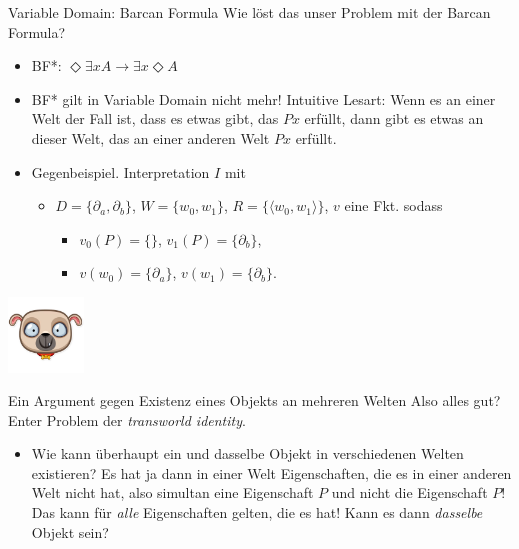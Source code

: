 \documentclass[12pt]{beamer}
\begin{document}
\begin{frame}{Variable Domain: Barcan Formula}
  Wie löst das unser Problem mit der Barcan Formula?
  \begin{itemize}[<+->]
  \item \begin{center} BF*:
      $\Diamond \exists x A \to \exists x \Diamond A$
    \end{center}
  \item BF* gilt in Variable Domain nicht mehr! Intuitive Lesart: Wenn
    es an einer Welt der Fall ist, dass es etwas gibt, das $Px$
    erfüllt, dann gibt es etwas an dieser Welt, das an einer anderen
    Welt $Px$ erfüllt.
  \item Gegenbeispiel. Interpretation $I$ mit
    \begin{itemize}[<+->]
    \item $D = \{\partial_a, \partial_b\}$, $W = \{w_0, w_1\}$,
      $R = \{\langle w_0, w_1 \rangle\}$, $v$ eine Fkt. sodass
      \begin{itemize}[<+->]
      \item $v_0(P) = \{\}$, $v_1(P) = \{\partial_b\}$,
      \item $v(w_0) = \{\partial_a\}$, $v(w_1) = \{\partial_b\}$.
      \end{itemize}
    \end{itemize}
  \end{itemize}

\pause
\begin{center}
      \includegraphics[height=2cm]{happydog.png}
\end{center}
\end{frame}

\begin{frame}{Ein Argument gegen Existenz eines Objekts an mehreren Welten}
Also alles gut? Enter Problem der \emph{transworld identity}.
\pause
\begin{itemize}[<+->]
\item Wie kann überhaupt ein und dasselbe Objekt in verschiedenen Welten existieren? Es hat ja dann in einer Welt Eigenschaften, die es in einer anderen Welt nicht hat, also simultan eine Eigenschaft $P$ und nicht die Eigenschaft $P$! Das kann für \emph{alle} Eigenschaften gelten, die es hat! Kann es dann \emph{dasselbe} Objekt sein?

\end{itemize}

\end{frame}
\end{document}
